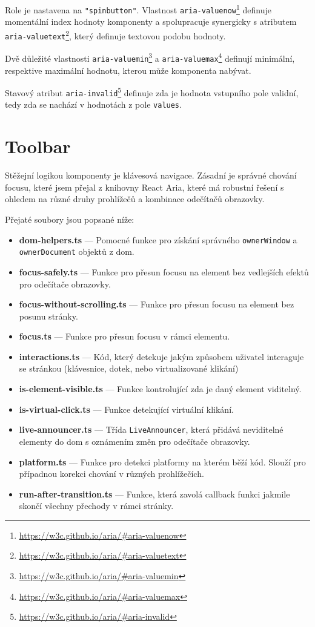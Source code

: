 Role je nastavena na \texttt{"spinbutton"}.
Vlastnost \texttt{aria-valuenow}\footnote{\url{https://w3c.github.io/aria/\#aria-valuenow}} definuje momentální index hodnoty komponenty a spolupracuje synergicky s atributem \texttt{aria-valuetext}\footnote{\url{https://w3c.github.io/aria/\#aria-valuetext}}, který definuje textovou podobu hodnoty.

Dvě důležité vlastnosti \texttt{aria-valuemin}\footnote{\url{https://w3c.github.io/aria/\#aria-valuemin}} a \texttt{aria-valuemax}\footnote{\url{https://w3c.github.io/aria/\#aria-valuemax}} definují minimální, respektive maximální hodnotu, kterou může komponenta nabývat.

Stavový atribut \texttt{aria-invalid}\footnote{\url{https://w3c.github.io/aria/\#aria-invalid}} definuje zda je hodnota vstupního pole validní, tedy zda se nachází v hodnotách z pole \texttt{values}.

\clearpage

\section{Toolbar}

Stěžejní logikou komponenty  je klávesová navigace.
Zásadní je správné chování focusu, které jsem přejal z knihovny React Aria, které má robustní řešení s ohledem na různé druhy prohlížečů a kombinace odečítačů obrazovky.

Přejaté soubory jsou popsané níže:

\begin{itemize}
    \item \textbf{dom-helpers.ts} --- Pomocné funkce pro získání správného \texttt{ownerWindow} a \texttt{ownerDocument} objektů z \gls{dom}.
    \item \textbf{focus-safely.ts} --- Funkce pro přesun focusu na element bez vedlejších efektů pro odečítače obrazovky.
    \item \textbf{focus-without-scrolling.ts} --- Funkce pro přesun focusu na element bez posunu stránky.
    \item \textbf{focus.ts} --- Funkce pro přesun focusu v rámci elementu.
    \item \textbf{interactions.ts} --- Kód, který detekuje jakým způsobem uživatel interaguje se stránkou (klávesnice, dotek, nebo virtualizované klikání)
    \item \textbf{is-element-visible.ts} --- Funkce kontrolující zda je daný element viditelný.
    \item \textbf{is-virtual-click.ts} --- Funkce detekující virtuální klikání.
    \item \textbf{live-announcer.ts} --- Třída \texttt{LiveAnnouncer}, která přidává neviditelné elementy do \gls{dom} s oznámením změn pro odečítače obrazovky.
    \item \textbf{platform.ts} --- Funkce pro detekci platformy na kterém běží kód. Slouží pro případnou korekci chování v různých prohlížečích.
    \item \textbf{run-after-transition.ts} --- Funkce, která zavolá callback funkci jakmile skončí všechny přechody v rámci stránky.
\end{itemize}

